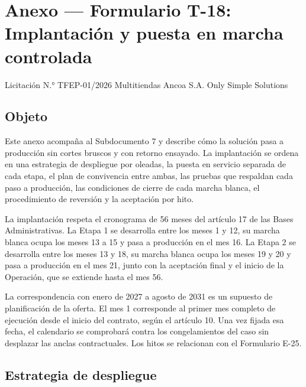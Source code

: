 \documentclass[11pt]{article}
\begin{document}
\hypersetup{pageanchor=false}
\hypersetup{pageanchor=true}
\tableofcontents
\clearpage


\clearpage
\section*{Anexo --- Formulario T-18: Implantación y puesta en marcha controlada}\label{anexo-formulario-t-18}

Licitación N.° TFEP-01/2026
Multitiendas Ancoa S.A.
Only Simple Solutions

\subsection*{Objeto}

Este anexo acompaña al Subdocumento 7 y describe cómo la solución pasa a producción sin cortes bruscos y con retorno ensayado. La implantación se ordena en una estrategia de despliegue por oleadas, la puesta en servicio separada de cada etapa, el plan de convivencia entre ambas, las pruebas que respaldan cada paso a producción, las condiciones de cierre de cada marcha blanca, el procedimiento de reversión y la aceptación por hito.

La implantación respeta el cronograma de 56 meses del artículo 17 de las Bases Administrativas. La Etapa 1 se desarrolla entre los meses 1 y 12, su marcha blanca ocupa los meses 13 a 15 y pasa a producción en el mes 16. La Etapa 2 se desarrolla entre los meses 13 y 18, su marcha blanca ocupa los meses 19 y 20 y pasa a producción en el mes 21, junto con la aceptación final y el inicio de la Operación, que se extiende hasta el mes 56.

La correspondencia con enero de 2027 a agosto de 2031 es un supuesto de planificación de la oferta. El mes 1 corresponde al primer mes completo de ejecución desde el inicio del contrato, según el artículo 10. Una vez fijada esa fecha, el calendario se comprobará contra los congelamientos del caso sin desplazar las anclas contractuales. Los hitos se relacionan con el Formulario E-25.

\subsection*{Estrategia de despliegue}
\end{document}
